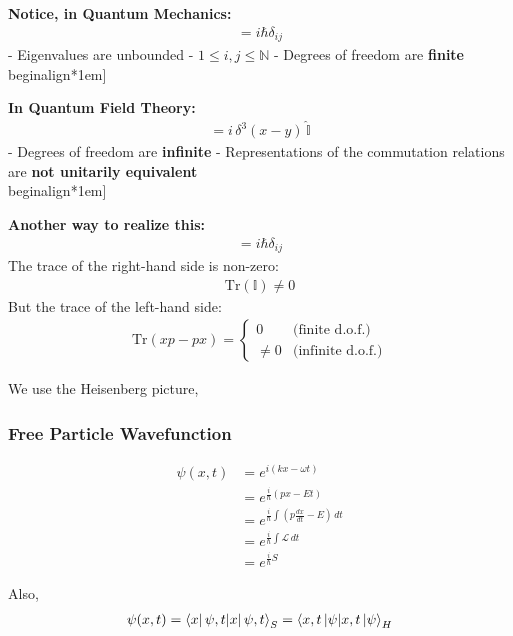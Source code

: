 \documentclass[14pt]{article} %
\begin{document}
\begin{tcolorbox}
\textbf{Notice, in Quantum Mechanics:}
\begin{align*}
[x_i, p_j] = i \hbar \delta_{ij}
\end{align*}
- Eigenvalues are unbounded  
- \(1 \leq i,j \leq \mathbb{N}\)  
- Degrees of freedom are \textbf{finite} \\begin{align*}1em]

\textbf{In Quantum Field Theory:}
\begin{align*}
[\phi(x), \pi(y)] = i\, \delta^3(x - y)\, \hat{\mathbb{I}}
\end{align*}
- Degrees of freedom are \textbf{infinite}  
- Representations of the commutation relations are \textbf{not unitarily equivalent} \\begin{align*}1em]

\textbf{Another way to realize this:}
\begin{align*}
[x_i, p_j] = i \hbar \delta_{ij}
\end{align*}
The trace of the right-hand side is non-zero:  
\begin{align*}
\mathrm{Tr}(\mathbb{I}) \neq 0
\end{align*}
But the trace of the left-hand side:
\begin{align*}
\mathrm{Tr}(xp - px) =
\begin{cases}
0        & \text{(finite d.o.f.)} \\
\neq 0   & \text{(infinite d.o.f.)}
\end{cases}
\end{align*}
\end{tcolorbox}
\noindent
We use the Heisenberg picture,

\subsubsection*{Free Particle Wavefunction}

\begin{align*}
\psi(x,t) &= e^{i(kx - \omega t)} \\
          &= e^{\frac{i}{\hbar}(px - Et)} \\
          &= e^{\frac{i}{\hbar} \int (p \frac{dx}{dt} - E) \, dt} \\
          &= e^{\frac{i}{\hbar} \int \mathcal{L} \, dt} \\
          &= e^{\frac{i}{\hbar} S}
\end{align*}

Also,
\begin{align*}
\psi(x,t) = \braket{x |\, \psi, t}_S = \braket{x,t\, | \psi}_H
\end{align*}
\end{document}
